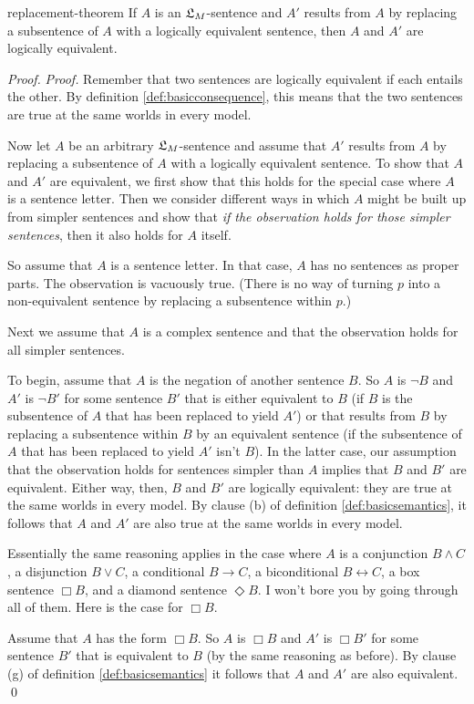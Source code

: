 \begin{observation}{replacement-theorem}
  If $A$ is an $\mathfrak{L}_{M}$-sentence and $A'$ results from $A$ by replacing a
  subsentence of $A$ with a logically equivalent sentence, then $A$ and $A'$ are
  logically equivalent.
\end{observation}
\begin{proof}
  \emph{Proof.} Remember that two sentences are logically equivalent if each
  entails the other. By definition \ref{def:basicconsequence}, this means that
  the two sentences are true at the same worlds in every model.

  Now let $A$ be an arbitrary $\mathfrak{L}_{M}$-sentence and assume that $A'$ results
  from $A$ by replacing a subsentence of $A$ with a logically equivalent
  sentence. To show that $A$ and $A'$ are equivalent, we first show that this
  holds for the special case where $A$ is a sentence letter. Then we consider
  different ways in which $A$ might be built up from simpler sentences and show
  that \emph{if the observation holds for those simpler sentences}, then it also
  holds for $A$ itself.

  So assume that $A$ is a sentence letter. In that case, $A$ has no sentences as
  proper parts. The observation is vacuously true. (There is no way of turning
  $p$ into a non-equivalent sentence by replacing a subsentence within $p$.)

  Next we assume that $A$ is a complex sentence and that the observation holds
  for all simpler sentences.

  To begin, assume that $A$ is the negation of another sentence $B$. So $A$ is
  $\neg B$ and $A'$ is $\neg B'$ for some sentence $B'$ that is either
  equivalent to $B$ (if $B$ is the subsentence of $A$ that has been replaced to
  yield $A'$) or that results from $B$ by replacing a subsentence within $B$ by
  an equivalent sentence (if the subsentence of $A$ that has been replaced to
  yield $A'$ isn't $B$). In the latter case, our assumption that the observation
  holds for sentences simpler than $A$ implies that $B$ and $B'$ are equivalent.
  Either way, then, $B$ and $B'$ are logically equivalent: they are true at the
  same worlds in every model. By clause (b) of definition
  \ref{def:basicsemantics}, it follows that $A$ and $A'$ are also true at the
  same worlds in every model.

  Essentially the same reasoning applies in the case where $A$ is a conjunction
  $B \land C$, a disjunction $B \lor C$, a conditional $B \to C$, a
  biconditional $B \leftrightarrow C$, a box sentence $\Box B$, and a diamond
  sentence $\Diamond B$. I won't bore you by going through all of them. Here is
  the case for $\Box B$.
  
  Assume that $A$ has the form $\Box B$. So $A$ is $\Box B$ and $A'$ is
  $\Box B'$ for some sentence $B'$ that is equivalent to $B$ (by the same
  reasoning as before). By clause (g) of definition \ref{def:basicsemantics} it
  follows that $A$ and $A'$ are also equivalent. \qed

\end{proof}

